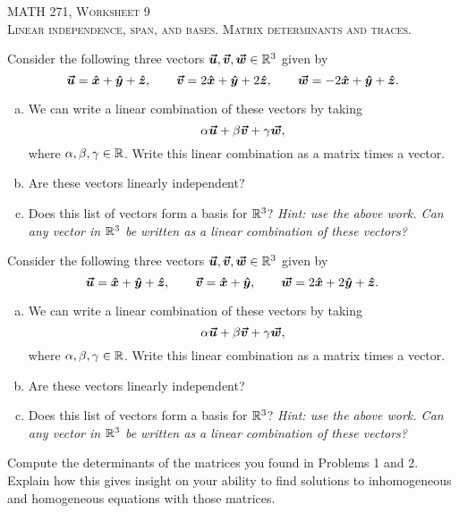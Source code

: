 \documentclass[12pt]{article} %
\begin{document}
\begin{center}
   \textsc{\large MATH 271, Worksheet 9}\\
   \textsc{Linear independence, span, and bases. Matrix determinants and traces.}
\end{center}
\vspace{.5cm}



\begin{problem}
Consider the following three vectors $\boldsymbol{\boldsymbol{\vec{u}}},\boldsymbol{\boldsymbol{\vec{v}}},\boldsymbol{\boldsymbol{\vec{w}}}\in \mathbb{R}^3$ given by
\[
\boldsymbol{\boldsymbol{\vec{u}}} = \boldsymbol{\hat{x}} + \boldsymbol{\hat{y}} +\boldsymbol{\hat{z}}, \qquad \boldsymbol{\boldsymbol{\vec{v}}} = 2\boldsymbol{\hat{x}} + \boldsymbol{\hat{y}} + 2\boldsymbol{\hat{z}}, \qquad \boldsymbol{\boldsymbol{\vec{w}}} = -2\boldsymbol{\hat{x}} + \boldsymbol{\hat{y}} +\boldsymbol{\hat{z}}. 
\]
\begin{enumerate}[(a)]
    \item We can write a linear combination of these vectors by taking
    \[
    \alpha \boldsymbol{\boldsymbol{\vec{u}}} + \beta \boldsymbol{\boldsymbol{\vec{v}}} + \gamma \boldsymbol{\boldsymbol{\vec{w}}},
    \]
    where $\alpha,\beta,\gamma \in \mathbb{R}$.  Write this linear combination as a matrix times a vector.
    \item Are these vectors linearly independent?
    \item Does this list of vectors form a basis for $\mathbb{R}^3$? \emph{Hint: use the above work. Can any vector in $\mathbb{R}^3$ be written as a linear combination of these vectors?}
\end{enumerate}
\end{problem}

\begin{problem}
Consider the following three vectors $\boldsymbol{\boldsymbol{\vec{u}}},\boldsymbol{\boldsymbol{\vec{v}}},\boldsymbol{\boldsymbol{\vec{w}}}\in \mathbb{R}^3$ given by
\[
\boldsymbol{\boldsymbol{\vec{u}}} = \boldsymbol{\hat{x}} + \boldsymbol{\hat{y}} +\boldsymbol{\hat{z}}, \qquad \boldsymbol{\boldsymbol{\vec{v}}} = \boldsymbol{\hat{x}} + \boldsymbol{\hat{y}}, \qquad \boldsymbol{\boldsymbol{\vec{w}}} = 2\boldsymbol{\hat{x}} + 2\boldsymbol{\hat{y}} +\boldsymbol{\hat{z}}. 
\]
\begin{enumerate}[(a)]
    \item We can write a linear combination of these vectors by taking
    \[
    \alpha \boldsymbol{\boldsymbol{\vec{u}}} + \beta \boldsymbol{\boldsymbol{\vec{v}}} + \gamma \boldsymbol{\boldsymbol{\vec{w}}},
    \]
    where $\alpha,\beta,\gamma \in \mathbb{R}$.  Write this linear combination as a matrix times a vector.
    \item Are these vectors linearly independent?
    \item Does this list of vectors form a basis for $\mathbb{R}^3$? \emph{Hint: use the above work. Can any vector in $\mathbb{R}^3$ be written as a linear combination of these vectors?}
\end{enumerate}
\end{problem}

\begin{problem}
Compute the determinants of the matrices you found in Problems 1 and 2.  Explain how this gives insight on your ability to find solutions to inhomogeneous and homogeneous equations with those matrices.
\end{problem}
\end{document}
